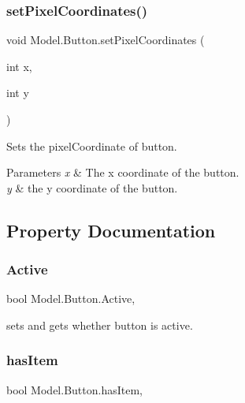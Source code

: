 \subsubsection{\texorpdfstring{set\+Pixel\+Coordinates()}{setPixelCoordinates()}}
{\footnotesize\ttfamily void Model.\+Button.\+set\+Pixel\+Coordinates (\begin{DoxyParamCaption}\item[{int}]{x,  }\item[{int}]{y }\end{DoxyParamCaption})\hspace{0.3cm}{\ttfamily [inline]}}

Sets the pixel\+Coordinate of button. 
\begin{DoxyParams}{Parameters}
{\em x} & The x coordinate of the button. \\
\hline
{\em y} & the y coordinate of the button. \\
\hline
\end{DoxyParams}


\subsection{Property Documentation}
\hypertarget{class_model_1_1_button_a77f2ad040a06defce5c3e8b5cd641a71}{}\label{class_model_1_1_button_a77f2ad040a06defce5c3e8b5cd641a71} 
\subsubsection{\texorpdfstring{Active}{Active}}
{\footnotesize\ttfamily bool Model.\+Button.\+Active\hspace{0.3cm}{\ttfamily [get]}, {\ttfamily [set]}}

sets and gets whether button is active. \hypertarget{class_model_1_1_button_a6b834edf8485c0dc7a10abfd43c38e77}{}\label{class_model_1_1_button_a6b834edf8485c0dc7a10abfd43c38e77} 
\subsubsection{\texorpdfstring{has\+Item}{hasItem}}
{\footnotesize\ttfamily bool Model.\+Button.\+has\+Item\hspace{0.3cm}{\ttfamily [get]}, {\ttfamily [set]}}

